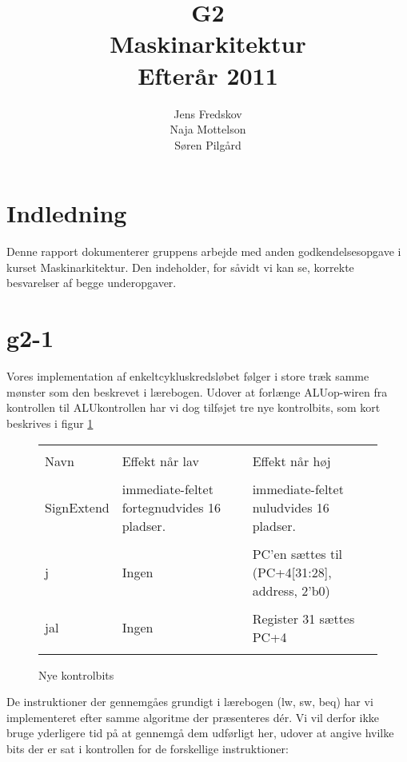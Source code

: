 \documentclass[10pt,a4paper,danish]{article}
\title{G2\\Maskinarkitektur\\Efterår 2011}
\author{Jens Fredskov\\ Naja Mottelson\\Søren Pilgård}
\begin{document}
\maketitle
\newpage

\tableofcontents
\newpage

\section{Indledning}
Denne rapport dokumenterer gruppens arbejde med anden godkendelsesopgave i kurset Maskinarkitektur. Den indeholder, for såvidt vi kan se, korrekte besvarelser af begge underopgaver. 

\section{g2-1}
Vores implementation af enkeltcykluskredsløbet følger i store træk samme mønster som den beskrevet i lærebogen. Udover at forlænge ALUop-wiren fra kontrollen til ALUkontrollen har vi dog tilføjet tre nye kontrolbits, som kort beskrives i figur \ref{fig:newcontrols}

\begin{figure}[htb]
  \begin{tabular}{| l | p{5cm} | p{5cm} |}
    \hline\\
    Navn & Effekt når lav & Effekt når høj\\ 
    \hline\\
    SignExtend & immediate-feltet fortegnudvides 16 pladser. & immediate-feltet nuludvides 16 pladser.\\
    \hline\\
    j & Ingen & PC'en sættes til (PC+4[31:28], address, 2'b0) \\
    \hline\\
    jal & Ingen & Register 31 sættes PC+4\\
    \hline\\
  \end{tabular}
  \caption{Nye kontrolbits}
  \label{fig:newcontrols}
\end{figure}

De instruktioner der gennemgåes grundigt i lærebogen (lw, sw, beq) har vi implementeret efter samme algoritme der præsenteres dér. Vi vil derfor ikke bruge yderligere tid på at gennemgå dem udførligt her, udover at angive hvilke bits der er sat i kontrollen for de forskellige instruktioner: 
\end{document}
